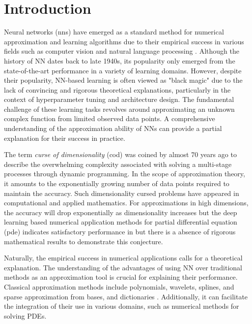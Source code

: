 \chapter{Introduction}
\label{ch:introduction}



Neural networks (\gls{nn}s) have emerged as a standard method for numerical
approximation and learning algorithms due to their empirical success in various
fields such as computer vision and natural language processing
\citep{shalev-shwartzUnderstandingMachineLearning2014}. Although the history of
NN dates back to late 1940s, its popularity only emerged from the
state-of-the-art performance in a variety of learning domains. However, despite
their popularity, NN-based learning is often viewed as "black magic" due to the
lack of convincing and rigorous theoretical explanations, particularly in the
context of hyperparameter tuning and architecture design. The fundamental
challenge of these learning tasks revolves around approximating an unknown
complex function from limited observed data points. A comprehensive
understanding of the approximation ability of NNs can provide a partial
explanation for their success in practice.


The term \textit{curse of dimensionality} (\gls{cod}) was coined by
\cite{bellmanTheoryDynamicProgramming1952} almost 70 years ago to describe the
overwhelming complexity associated with solving a multi-stage processes through
dynamic programming. In the scope of approximation theory, it amounts to the
exponentially growing number of data points required to maintain the accuracy.
Such dimensionality cursed problems have appeared in computational and applied
mathematics. For approximations in high dimensions, the accuracy will drop
exponentially as dimensionality increases but the deep learning based numerical
application methods for partial differential equation (\gls{pde}) indicates
satisfactory performance in \cite{eDeepRitzMethod2017,
eDeepLearningbasedNumerical2017,beckMachineLearningApproximation2019} but there
is a absence of rigorous mathematical results to demonstrate this conjecture.



Naturally, the empirical success in numerical applications calls for a
theoretical explanation. The understanding of the advantages of using NN over
traditional methods as an approximation tool is crucial for explaining their
performance. Classical approximation methods include polynomials, wavelets,
splines, and sparse approximation from bases, and dictionaries
\citep{devore_1998}. Additionally, it can facilitate the integration of their
use in various domains, such as numerical methods for solving PDEs.

